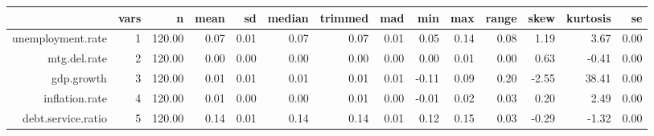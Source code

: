 \begin{table}[ht]
\centering
\begin{tabular}{rrrrrrrrrrrrrr}
  \hline
 & vars & n & mean & sd & median & trimmed & mad & min & max & range & skew & kurtosis & se \\ 
  \hline
unemployment.rate &   1 & 120.00 & 0.07 & 0.01 & 0.07 & 0.07 & 0.01 & 0.05 & 0.14 & 0.08 & 1.19 & 3.67 & 0.00 \\ 
  mtg.del.rate &   2 & 120.00 & 0.00 & 0.00 & 0.00 & 0.00 & 0.00 & 0.00 & 0.01 & 0.00 & 0.63 & -0.41 & 0.00 \\ 
  gdp.growth &   3 & 120.00 & 0.01 & 0.01 & 0.01 & 0.01 & 0.01 & -0.11 & 0.09 & 0.20 & -2.55 & 38.41 & 0.00 \\ 
  inflation.rate &   4 & 120.00 & 0.01 & 0.00 & 0.00 & 0.01 & 0.00 & -0.01 & 0.02 & 0.03 & 0.20 & 2.49 & 0.00 \\ 
  debt.service.ratio &   5 & 120.00 & 0.14 & 0.01 & 0.14 & 0.14 & 0.01 & 0.12 & 0.15 & 0.03 & -0.29 & -1.32 & 0.00 \\ 
   \hline
\end{tabular}
\end{table}
